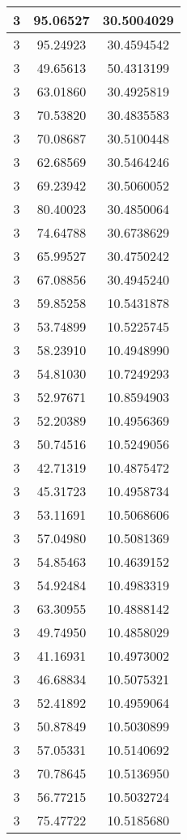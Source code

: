 \documentclass[
]{book}
\begin{document}
\begin{tabular}{c|c|c}
\hline
3 & 95.06527 & 30.5004029\\
\hline
3 & 95.24923 & 30.4594542\\
\hline
3 & 49.65613 & 50.4313199\\
\hline
3 & 63.01860 & 30.4925819\\
\hline
3 & 70.53820 & 30.4835583\\
\hline
3 & 70.08687 & 30.5100448\\
\hline
3 & 62.68569 & 30.5464246\\
\hline
3 & 69.23942 & 30.5060052\\
\hline
3 & 80.40023 & 30.4850064\\
\hline
3 & 74.64788 & 30.6738629\\
\hline
3 & 65.99527 & 30.4750242\\
\hline
3 & 67.08856 & 30.4945240\\
\hline
3 & 59.85258 & 10.5431878\\
\hline
3 & 53.74899 & 10.5225745\\
\hline
3 & 58.23910 & 10.4948990\\
\hline
3 & 54.81030 & 10.7249293\\
\hline
3 & 52.97671 & 10.8594903\\
\hline
3 & 52.20389 & 10.4956369\\
\hline
3 & 50.74516 & 10.5249056\\
\hline
3 & 42.71319 & 10.4875472\\
\hline
3 & 45.31723 & 10.4958734\\
\hline
3 & 53.11691 & 10.5068606\\
\hline
3 & 57.04980 & 10.5081369\\
\hline
3 & 54.85463 & 10.4639152\\
\hline
3 & 54.92484 & 10.4983319\\
\hline
3 & 63.30955 & 10.4888142\\
\hline
3 & 49.74950 & 10.4858029\\
\hline
3 & 41.16931 & 10.4973002\\
\hline
3 & 46.68834 & 10.5075321\\
\hline
3 & 52.41892 & 10.4959064\\
\hline
3 & 50.87849 & 10.5030899\\
\hline
3 & 57.05331 & 10.5140692\\
\hline
3 & 70.78645 & 10.5136950\\
\hline
3 & 56.77215 & 10.5032724\\
\hline
3 & 75.47722 & 10.5185680\\

\end{tabular}
\end{document}
